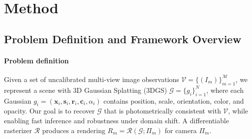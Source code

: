 \section{Method}





\subsection{Problem Definition and Framework Overview}
\label{sec:problem_definition}

\paragraph{Problem definition} 
Given a set of uncalibrated multi-view image observations
$\mathcal{V}=\{(I_m)\}_{m=1}^{\mathcal{M}}$,
we represent a scene with 3D Gaussian Splatting (3DGS)
$\mathcal{G}=\{g_i\}_{i=1}^{N}$, where each Gaussian
$g_i=(\mathbf{x}_i,\mathbf{s}_i,\mathbf{r}_i,\mathbf{c}_i,\alpha_i)$
contains position, scale, orientation, color, and opacity. Our goal is to recover $\mathcal{G}$ that is photometrically consistent with $\mathcal{V}$,
while enabling fast inference and robustness under domain shift. A differentiable rasterizer $\mathcal{R}$ produces a rendering
$R_m=\mathcal{R}(\mathcal{G};\Pi_m)$ for camera $\Pi_m$.

